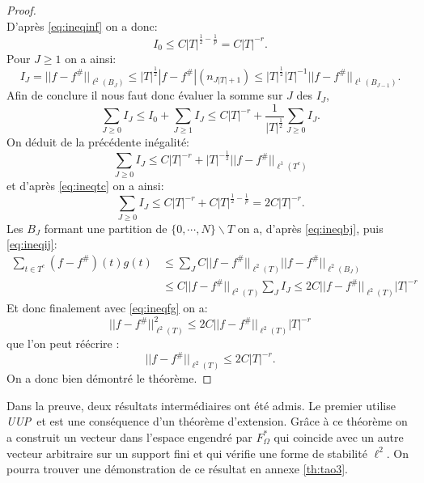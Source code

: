 \begin{proof}
\begin{equation}
	\end{equation}
	D'après \ref{eq:ineqinf} on a donc:
	\begin{equation}
		I_0 \leq C|T|^{\frac{1}{2} - \frac{1}{p}} = C|T|^{-r}.
	\end{equation}
	Pour $J\geq 1$ on a ainsi:
	\begin{equation}
		I_J =||f-f^\#||_{\ell^{2}(B_{J})} \leq |T|^\frac{1}{2}|f-f^\#|(n_{J|T|+1}) \leq |T|^\frac{1}{2} |T|^{-1} ||f-f^\#||_{\ell^1(B_{J-1})}.
	\end{equation}
	Afin de conclure il nous faut donc évaluer la somme sur $J$ des $I_J$,
	\begin{equation}\label{eq:ineqij}
		\sum_{J\geq 0} I_J \leq I_0 + \sum_{J\geq 1} I_J  \leq C|T|^{-r} +\frac{1}{|T|^{\frac{1}{2}}} \sum_{J\geq 0} I_J.
	\end{equation}
	On déduit de la précédente inégalité:
	\begin{equation}
		\sum_{J\geq 0} I_J \leq C|T|^{-r} + |T|^{-\frac{1}{2}} ||f-f^\#||_{\ell^1(T^c)}
	\end{equation}
	et d'après \ref{eq:ineqtc} on a ainsi:
	\begin{equation}
		\sum_{J\geq 0} I_J \leq C|T|^{-r} + C|T|^{\frac{1}{2} - \frac{1}{p}} = 2C|T|^{-r}.
	\end{equation}
	Les $B_J$ formant une partition de $\{0, \cdots, N\}\backslash T$ on a, d'après \ref{eq:ineqbj}, puis \ref{eq:ineqij}:
	\begin{align}
		\sum_{t \in T^c} (f-f^\#)(t)g(t)&\leq \sum_J C ||f-f^\#||_{\ell^2(T)}||f-f^\#||_{\ell^2(B_J)} \\
						&\leq C||f-f^\#||_{\ell^2(T)}\sum_J I_J \leq 2C||f-f^\#||_{\ell^2(T)}|T|^{-r}
	\end{align}
	Et donc finalement avec \ref{eq:ineqfg} on a:
	\begin{equation}
		||f-f^\#||_{\ell^2(T)}^2\leq 2C ||f-f^\#||_{\ell^2(T)}|T|^{-r}
	\end{equation}
	que l'on peut réécrire :
	\begin{equation}
		||f-f^\#||_{\ell^2(T)}\leq 2C|T|^{-r}.
	\end{equation}
	On a donc bien démontré le théorème.	
\end{proof}
Dans la preuve, deux résultats intermédiaires ont été admis. Le premier utilise \emph{UUP} et est une conséquence d'un théorème d'extension.
Grâce à ce théorème on a construit un vecteur dans l'espace engendré par $F_\Omega^*$ qui coincide avec un autre vecteur arbitraire sur un support fini et qui vérifie une forme de stabilité $\ell^2$. On pourra trouver une démonstration de ce résultat en annexe \ref{th:tao3}.
